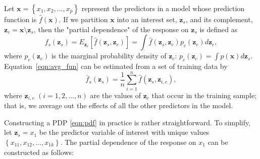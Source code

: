 \documentclass[12pt]{article}
\begin{document}
Let $\boldsymbol{x} = \left\{x_1, x_2, \dots, x_p\right\}$ represent the predictors in a model whose prediction function is $\widehat{f}\left(\boldsymbol{x}\right)$. If we partition $\boldsymbol{x}$ into an interest set, $\boldsymbol{z}_s$, and its complement, $\boldsymbol{z}_c = \boldsymbol{x} \setminus \boldsymbol{z}_s$, then the "partial dependence" of the response on $\boldsymbol{z}_s$ is defined as
\begin{equation}
\label{eqn:avg_fun}
  f_s\left(\boldsymbol{z}_s\right) = E_{\boldsymbol{z}_c}\left[\widehat{f}\left(\boldsymbol{z}_s, \boldsymbol{z}_c\right)\right] = \int \widehat{f}\left(\boldsymbol{z}_s, \boldsymbol{z}_c\right)p_{c}\left(\boldsymbol{z}_c\right)d\boldsymbol{z}_c,
\end{equation}
where $p_{c}\left(\boldsymbol{z}_c\right)$ is the marginal probability density of $\boldsymbol{z}_c$: $p_{c}\left(\boldsymbol{z}_c\right) = \int p\left(\boldsymbol{x}\right)d\boldsymbol{z}_s$.
Equation~\eqref{eqn:avg_fun} can be estimated from a set of training data by
\begin{equation}
\label{eqn:pdf}
\bar{f}_s\left(\boldsymbol{z}_s\right) = \frac{1}{n}\sum_{i = 1}^n\widehat{f}\left(\boldsymbol{z}_s,\boldsymbol{z}_{i, c}\right),
\end{equation}
where $\boldsymbol{z}_{i, c}$ $\left(i = 1, 2, \dots, n\right)$ are the values of $\boldsymbol{z}_c$ that occur in the training sample; that is, we average out the effects of all the other predictors in the model.

Constructing a PDP \eqref{eqn:pdf} in practice is rather straightforward. To simplify, let $\boldsymbol{z}_s = x_1$ be the predictor variable of interest with unique values $\left\{x_{11}, x_{12}, \dots, x_{1k}\right\}$. The partial dependence of the response on $x_1$ can be constructed as follows:
\end{document}
